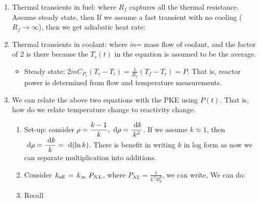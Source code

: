 \documentclass{school-22.211-notes}
\begin{document}
\begin{enumerate}
\item Thermal transients in fuel: 
  where $R_f$ captures all the thermal resistance. Assume steady state, then 
  If we assume a fast transient with no cooling ($R_f \to \infty$), then we get adiabatic heat rate:


\item Thermal transients in coolant: 
  where $\dot{m}$= mass flow of coolant, and the factor of $2$ is there because the $T_c(t)$ in the equation is assumed to be the average. 
  \begin{itemize}
    \item Steady state: $\displaystyle 2 \dot{m} C_{P_c} (T_c - T_i) = \frac{1}{R_f} (T_f - T_c) = P$. That is, reactor power is determined from flow and temperature measurements. 
  \end{itemize}


\item We can relate the above two equations with the PKE using $P(t)$. That is, how do we relate temperature change to reactivity change. 
  \begin{enumerate}
    \item Set-up: consider $\displaystyle \rho = \frac{k-1}{k}, \mbox{ }\mathrm{d} \rho = \frac{\mbox{ }\mathrm{d} k}{k^2}$. If we assume $k \approx 1$, then $\displaystyle \mbox{ }\mathrm{d} \rho =  \frac{\mbox{ }\mathrm{d} k}{k} = \mbox{ }\mathrm{d}(\ln k)$. There is benefit in writing $k$ in log form as now we can separate multiplication into additions. 

  \item Consider $\left. k_{\mathrm{eff}} \right. = \left. k_{\infty} \right. P_{NL}$, where $P_{NL} = \frac{1}{L^2 B_g^2}$, we can write, 
    We can do: 

  \item Recall 


\end{enumerate}
\end{enumerate}
\end{document}
